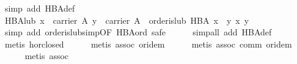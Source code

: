 \begin{isabellebody}
\isamarkupfalse%
\ {}simp\ add{}\ HBA{}def{}%
\endisatagproof
{\isafoldproof}%
%
\isadelimproof
\isanewline
%
\endisadelimproof
\isanewline
\ \ \isamarkupfalse%
\ HBA{}lub{}\ {}{}x\ {}\ carrier\ A{}\ y\ {}\ carrier\ A{}\ {}\ order{}is{}lub\ HBA\ {}x\ {}\ y{}\ {}x{}\ y{}{}\isanewline
%
\isadelimproof
\ \ \ \ %
\endisadelimproof
%
\isatagproof
{}\isamarkupfalse%
\ {}simp\ add{}\ order{}is{}lub{}simp{}OF\ HBA{}ord{}{}\ safe{}\isanewline
\ \ \ \ \isamarkupfalse%
\ {}simp{}all\ add{}\ HBA{}def{}\isanewline
\ \ \ \ \isamarkupfalse%
\ {}metis\ hor{}closed{}\isanewline
\ \ \ \ \isamarkupfalse%
\ {}metis\ assoc\ or{}idem{}\isanewline
\ \ \ \ \isamarkupfalse%
\ {}metis\ assoc\ comm\ or{}idem{}\isanewline
\ \ \ \ \isamarkupfalse%
\ {}metis\ assoc{}%
\endisatagproof
{\isafoldproof}%

\end{isabellebody}
